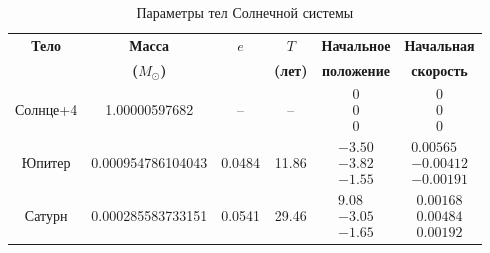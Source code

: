 \begin{table}
	\centering
	\caption{Параметры тел Солнечной системы}
	\label{tab:solar_system}
	\vspace{0.75em}
	
	\small
	\renewcommand{\arraystretch}{1.2}
	
	\begin{tabular}{@{}c c c c c c@{}}
		\toprule
		
		\textbf{Тело} &
		\textbf{Масса} &
		\textbf{$e$} &
		\textbf{$T$} &
		\textbf{Начальное} &
		\textbf{Начальная} \\
		
		&
		\textbf{($M_\odot$)} &
		&
		\textbf{(лет)} &
		\textbf{положение} &
		\textbf{скорость} \\
		
		\midrule
		
		Солнце+4 &
		1.00000597682 &
		-- &
		-- &
		$\begin{aligned}
			0\\
			0\\
			0
		\end{aligned}$ &
		$\begin{aligned}
			0\\
			0\\
			0
		\end{aligned}$ \\
		
		\midrule
		
		Юпитер &
		0.000954786104043 &
		0.0484 &
		11.86 &
		$\begin{aligned}
			-3.50\\
			-3.82\\
			-1.55
		\end{aligned}$ &
		$\begin{aligned}
			0.00565\\
			-0.00412\\
			-0.00191
		\end{aligned}$ \\
		
		\midrule
		
		Сатурн &
		0.000285583733151 &
		0.0541 &
		29.46 &
		$\begin{aligned}
			9.08\\
			-3.05\\
			-1.65
		\end{aligned}$ &
		$\begin{aligned}
			0.00168\\
			0.00484\\
			0.00192
		\end{aligned}$ \\
		

\end{tabular}
\end{table}
